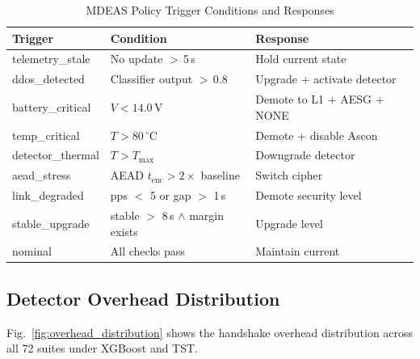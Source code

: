 \begin{table}[t]
\centering
\caption{MDEAS Policy Trigger Conditions and Responses}
\label{tab:policy_triggers}
\footnotesize
\setlength{\tabcolsep}{2pt}
\begin{tabular}{@{}p{2.2cm}p{2.8cm}p{2.4cm}@{}}
\toprule
\textbf{Trigger} & \textbf{Condition} & \textbf{Response} \\
\midrule
telemetry\_stale & No update $>$\,5\,s & Hold current state \\
ddos\_detected   & Classifier output $>$\,0.8 & Upgrade + activate detector \\
battery\_critical & $V < 14.0$\,V & Demote to L1 + AESG + NONE \\
temp\_critical   & $T > 80$\,$^\circ$C & Demote + disable Ascon \\
detector\_thermal & $T > T_\text{max}$ & Downgrade detector \\
aead\_stress     & AEAD $t_\text{enc} > 2\times$ baseline & Switch cipher \\
link\_degraded   & pps $<$ 5 or gap $>$ 1\,s & Demote security level \\
stable\_upgrade  & stable $>$ 8\,s $\wedge$ margin exists & Upgrade level \\
nominal          & All checks pass & Maintain current \\
\bottomrule
\end{tabular}
\end{table}

\subsection{Detector Overhead Distribution}
\label{sec:overhead_dist}

Fig.~\ref{fig:overhead_distribution} shows the handshake overhead
distribution across all 72 suites under XGBoost and TST.

